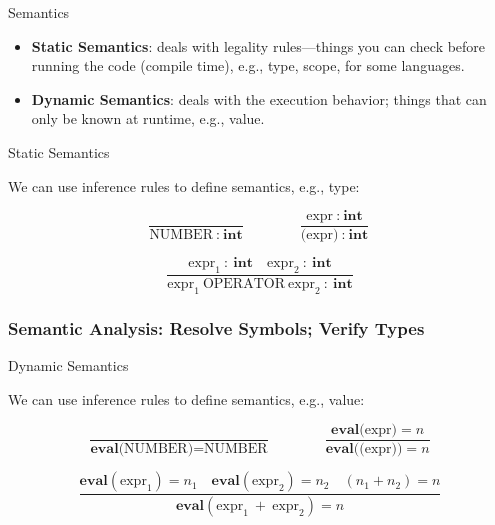 \documentclass{plt}
\begin{document}
\renewcommand{\id}[1]{
  node [fill=gray!15] (id) {#1}
  (id) .. controls +(-1,-2) and +(1,0) .. (#1.east)
}




\begin{frame}{Semantics}

\begin{itemize}
\item  \textbf{Static Semantics}:  deals with legality rules---things you can check \alert{before} running the code (compile time), e.g., type, scope, for some languages.
\item \textbf{Dynamic Semantics}: deals with the execution behavior; things that can only be known \alert{at} runtime, e.g., value.
\end{itemize}

\end{frame}

\begin{frame}{Static Semantics}

We can use inference rules to define semantics, e.g., type:

$$
\frac{}{\text{NUMBER}\ :\ \textbf{int}} \qquad\qquad
\frac{\text{expr}\ :\ \textbf{int}}{\text{(expr)}\ :\ \textbf{int}}
$$

$$
\frac{\text{expr}_1\ :\ \textbf{int} \quad \text{expr}_2\ :\ \textbf{int}}
{\text{expr}_1\ \text{OPERATOR}\ \text{expr}_2\ :\ \textbf{int}}
$$

\end{frame}


\begin{frame}
  \frametitle{Semantic Analysis: Resolve Symbols; Verify Types}


\end{frame}

\begin{frame}{Dynamic Semantics}

We can use inference rules to define semantics, e.g., value:

$$
\frac{}{\textbf{eval}\text{(NUMBER)} = \text{NUMBER}} \qquad\qquad
\frac{\textbf{eval}\text{(expr)} = n}{\textbf{eval}\text{((expr))} = n}
$$

$$
\frac{\textbf{eval}(\text{expr}_1) = n_1 \quad \textbf{eval}(\text{expr}_2) = n_2
\quad (n_1 + n _2) = n}
{\textbf{eval}(\text{expr}_1\ +\ \text{expr}_2) = n}
$$

\end{frame}
\end{document}
